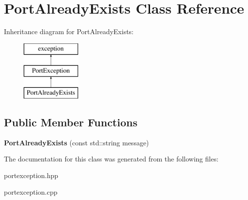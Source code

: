 \hypertarget{class_port_already_exists}{}\section{Port\+Already\+Exists Class Reference}
\label{class_port_already_exists}
Inheritance diagram for Port\+Already\+Exists\+:\begin{figure}[H]
\begin{center}
\leavevmode
\includegraphics[height=3.000000cm]{class_port_already_exists}
\end{center}
\end{figure}
\subsection*{Public Member Functions}
\begin{DoxyCompactItemize}
\item 
\hypertarget{class_port_already_exists_a50454163ba6c3315685b4f82f54df6d3}{}{\bfseries Port\+Already\+Exists} (const std\+::string message)\label{class_port_already_exists_a50454163ba6c3315685b4f82f54df6d3}

\end{DoxyCompactItemize}


The documentation for this class was generated from the following files\+:\begin{DoxyCompactItemize}
\item 
portexception.\+hpp\item 
portexception.\+cpp\end{DoxyCompactItemize}
